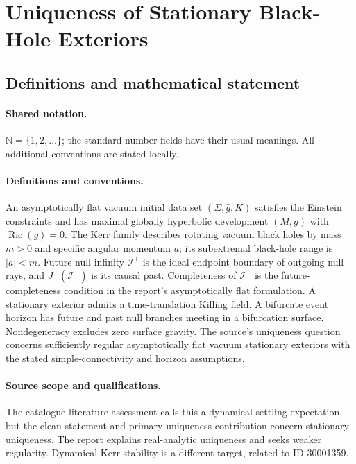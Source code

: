 \documentclass[11pt]{article}
\begin{document}
\section{Uniqueness of Stationary Black-Hole Exteriors}\label{statement}

\subsection{Definitions and mathematical statement}

\paragraph{Shared notation.}$\mathbb N=\{1,2,\ldots\}$; the standard number fields have their usual meanings. All additional conventions are stated locally.


\paragraph{Definitions and conventions.} An asymptotically flat vacuum initial data set $(\Sigma,\bar g,K)$ satisfies the Einstein constraints and has maximal globally hyperbolic development $(M,g)$ with $\operatorname{Ric}(g)=0$. The Kerr family describes rotating vacuum black holes by mass $m>0$ and specific angular momentum $a$; its subextremal black-hole range is $|a|<m$. Future null infinity $\mathcal I^+$ is the ideal endpoint boundary of outgoing null rays, and $J^-(\mathcal I^+)$ is its causal past. Completeness of $\mathcal I^+$ is the future-completeness condition in the report's asymptotically flat formulation. A stationary exterior admits a time-translation Killing field. A bifurcate event horizon has future and past null branches meeting in a bifurcation surface. Nondegeneracy excludes zero surface gravity. The source's uniqueness question concerns sufficiently regular asymptotically flat vacuum stationary exteriors with the stated simple-connectivity and horizon assumptions.

\paragraph{Source scope and qualifications.} The catalogue literature assessment calls this a dynamical settling expectation, but the clean statement and primary uniqueness contribution concern stationary uniqueness. The report explains real-analytic uniqueness and seeks weaker regularity. Dynamical Kerr stability is a different target, related to ID 30001359.
\end{document}

